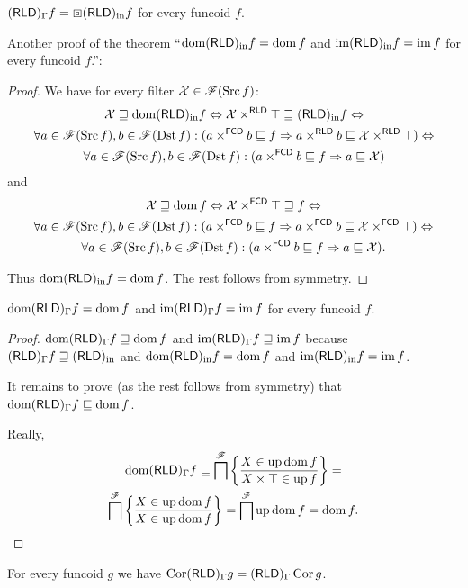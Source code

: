 \begin{conjecture}
$(\mathsf{RLD})_{\Gamma}f=\boxbox(\mathsf{RLD})_{\mathrm{in}} f$ for every funcoid $f$.
\end{conjecture}
Another proof of the theorem ``$\operatorname{dom}(\mathsf{RLD})_{\mathrm{in}} f=\operatorname{dom} f$ and $\operatorname{im}(\mathsf{RLD})_{\mathrm{in}} f=\operatorname{im} f$
for every funcoid $f$.'':
\begin{proof}
We have for every filter $\mathcal{X}\in\mathscr{F}(\operatorname{Src} f)$:
\begin{multline*}
\mathcal{X}\sqsupseteq\operatorname{dom}(\mathsf{RLD})_{\mathrm{in}} f\Leftrightarrow\mathcal{X}\times^{\mathsf{RLD}}\top\sqsupseteq(\mathsf{RLD})_{\mathrm{in}} f\Leftrightarrow\\
\forall a\in\mathscr{F}(\operatorname{Src} f),b\in\mathscr{F}(\operatorname{Dst} f):(a\times^{\mathsf{FCD}}b\sqsubseteq f\Rightarrow a\times^{\mathsf{RLD}}b\sqsubseteq\mathcal{X}\times^{\mathsf{RLD}}\top)\Leftrightarrow\\
\forall a\in\mathscr{F}(\operatorname{Src} f),b\in\mathscr{F}(\operatorname{Dst} f):(a\times^{\mathsf{FCD}}b\sqsubseteq f\Rightarrow a\sqsubseteq\mathcal{X})
\end{multline*}
and 
\begin{multline*}
\mathcal{X}\sqsupseteq\operatorname{dom} f\Leftrightarrow\mathcal{X}\times^{\mathsf{FCD}}\top\sqsupseteq f\Leftrightarrow\\
\forall a\in\mathscr{F}(\operatorname{Src} f),b\in\mathscr{F}(\operatorname{Dst} f):(a\times^{\mathsf{FCD}}b\sqsubseteq f\Rightarrow a\times^{\mathsf{FCD}}b\sqsubseteq\mathcal{X}\times^{\mathsf{FCD}}\top)\Leftrightarrow\\
\forall a\in\mathscr{F}(\operatorname{Src} f),b\in\mathscr{F}(\operatorname{Dst} f):(a\times^{\mathsf{FCD}}b\sqsubseteq f\Rightarrow a\sqsubseteq\mathcal{X}).
\end{multline*}


Thus $\operatorname{dom}(\mathsf{RLD})_{\mathrm{in}} f=\operatorname{dom} f$. The rest follows from symmetry.\end{proof}
\begin{prop}
$\operatorname{dom}(\mathsf{RLD})_{\Gamma}f=\operatorname{dom} f$ and $\operatorname{im}(\mathsf{RLD})_{\Gamma}f=\operatorname{im} f$
for every funcoid $f$.\end{prop}
\begin{proof}
$\operatorname{dom}(\mathsf{RLD})_{\Gamma}f\sqsupseteq\operatorname{dom} f$ and $\operatorname{im}(\mathsf{RLD})_{\Gamma}f\sqsupseteq\operatorname{im} f$
because $(\mathsf{RLD})_{\Gamma}f\sqsupseteq(\mathsf{RLD})_{\mathrm{in}}$ and $\operatorname{dom}(\mathsf{RLD})_{\mathrm{in}} f=\operatorname{dom} f$
and $\operatorname{im}(\mathsf{RLD})_{\mathrm{in}} f=\operatorname{im} f$.

It remains to prove (as the rest follows from symmetry) that $\operatorname{dom}(\mathsf{RLD})_{\Gamma}f\sqsubseteq\operatorname{dom} f$.

Really, 
\begin{multline*}
\operatorname{dom}(\mathsf{RLD})_{\Gamma}f\sqsubseteq\bigsqcap^{\mathscr{F}}\left\{ \frac{X\in\operatorname{up}\operatorname{dom} f}{X\times\top\in\operatorname{up} f}\right\}=\\
\bigsqcap^{\mathscr{F}}\left\{ \frac{X\in\operatorname{up}\operatorname{dom} f}{X\in\operatorname{up}\operatorname{dom} f}\right\}=\bigsqcap^{\mathscr{F}}\operatorname{up}\operatorname{dom} f=\operatorname{dom} f.
\end{multline*}
\end{proof}
\begin{conjecture}
For every funcoid $g$ we have $\operatorname{Cor}(\mathsf{RLD})_{\Gamma}g=(\mathsf{RLD})_{\Gamma}\operatorname{Cor} g$.
\end{conjecture}

